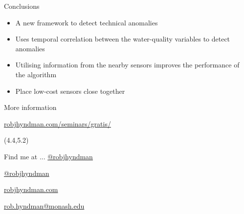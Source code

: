 \documentclass[14pt,ignorenonframetext,compress]{beamer}
\begin{document}
\begin{frame}{Conclusions}
\protect\hypertarget{conclusions}{}
\begin{itemize}
\item
  A new framework to detect technical anomalies
\item
  Uses temporal correlation between the water-quality variables to
  detect anomalies
\item
  Utilising information from the nearby sensors improves the performance
  of the algorithm
\item
  Place low-cost sensors close together
\end{itemize}
\end{frame}

\begin{frame}{More information}
\protect\hypertarget{more-information}{}
\fontsize{18}{20}\sf

\vspace*{1cm}

\begin{block}{}
\url{robjhyndman.com/seminars/gratis/}
\end{block}

\begin{textblock}{8}(4.4,5.2)
\begin{alertblock}{Find me at ...}
\href{https://twitter.com/robjhyndman}{ @robjhyndman}

\href{https://github.com/robjhyndman}{  @robjhyndman}

\href{https://robjhyndman.com}{ robjhyndman.com}

\href{mailto:rob.hyndman@monash.edu}{  rob.hyndman@monash.edu}
\end{alertblock}
\end{textblock}
\vspace*{10cm}
\end{frame}
\end{document}
